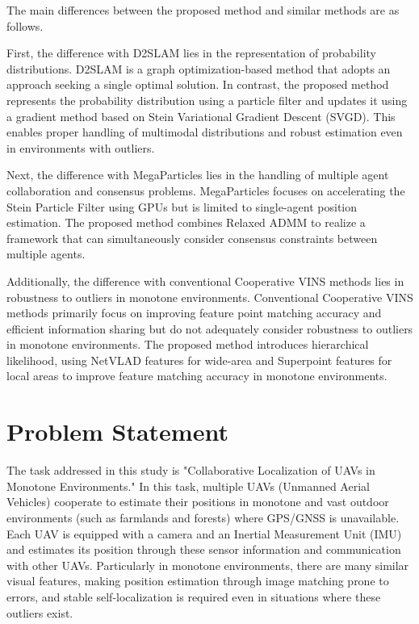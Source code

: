 \documentclass[a4paper,fleqn,10pt,twocolumn]{SICE_ISCS}
\begin{document}
The main differences between the proposed method and similar methods are as follows.

First, the difference with D2SLAM \cite{Xu2020} lies in the representation of probability distributions. D2SLAM is a graph optimization-based method that adopts an approach seeking a single optimal solution. In contrast, the proposed method represents the probability distribution using a particle filter and updates it using a gradient method based on Stein Variational Gradient Descent (SVGD). This enables proper handling of multimodal distributions and robust estimation even in environments with outliers.

Next, the difference with MegaParticles \cite{Koide2021} lies in the handling of multiple agent collaboration and consensus problems. MegaParticles focuses on accelerating the Stein Particle Filter using GPUs but is limited to single-agent position estimation. The proposed method combines Relaxed ADMM to realize a framework that can simultaneously consider consensus constraints between multiple agents.

Additionally, the difference with conventional Cooperative VINS methods \cite{Schmuck2018} lies in robustness to outliers in monotone environments. Conventional Cooperative VINS methods primarily focus on improving feature point matching accuracy and efficient information sharing but do not adequately consider robustness to outliers in monotone environments. The proposed method introduces hierarchical likelihood, using NetVLAD features for wide-area and Superpoint features for local areas to improve feature matching accuracy in monotone environments.

\section{Problem Statement}
The task addressed in this study is "Collaborative Localization of UAVs in Monotone Environments." In this task, multiple UAVs (Unmanned Aerial Vehicles) cooperate to estimate their positions in monotone and vast outdoor environments (such as farmlands and forests) where GPS/GNSS is unavailable. Each UAV is equipped with a camera and an Inertial Measurement Unit (IMU) and estimates its position through these sensor information and communication with other UAVs. Particularly in monotone environments, there are many similar visual features, making position estimation through image matching prone to errors, and stable self-localization is required even in situations where these outliers exist.
\end{document}
